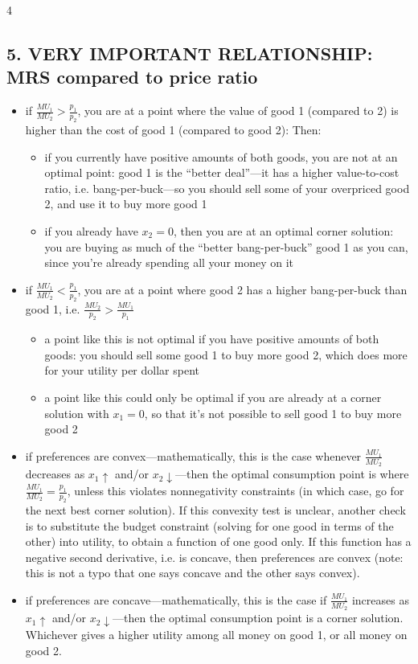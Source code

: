 \documentclass[8pt,landscape]{extarticle}
\begin{document}
\begin{multicols}{4}
\subsection*{5. VERY IMPORTANT RELATIONSHIP: MRS compared to price ratio}
\begin{itemize}[leftmargin=*,noitemsep,topsep=0pt]
\item if $\frac{MU_1}{MU_2} > \frac{p_1}{p_2}$, you are at a point where the value of good 1 (compared to 2) is higher than the cost of good 1 (compared to good 2): Then:
\begin{itemize}[leftmargin=*,noitemsep,topsep=0pt]
\item if you currently have positive amounts of both goods, you are not at an optimal point: good 1 is the ``better deal''---it has a higher value-to-cost ratio, i.e. bang-per-buck---so you should sell some of your overpriced good 2, and use it to buy more good 1
\item if you already have $x_2 = 0$, then you are at an optimal corner solution: you are buying as much of the ``better bang-per-buck'' good 1 as you can, since you're already spending all your money on it
\end{itemize}
\item if $\frac{MU_1}{MU_2} < \frac{p_1}{p_2}$, you are at a point where good 2 has a higher bang-per-buck than good 1, i.e. $\frac{MU_2}{p_2} > \frac{MU_1}{p_1}$
\begin{itemize}[leftmargin=*,noitemsep,topsep=0pt]
\item a point like this is not optimal if you have positive amounts of both goods: you should sell some good 1 to buy more good 2, which does more for your utility per dollar spent
\item a point like this could only be optimal if you are already at a corner solution with $x_1 = 0$, so that it's not possible to sell good 1 to buy more good 2
\end{itemize}
\item if preferences are convex---mathematically, this is the case whenever $\frac{MU_1}{MU_2}$ decreases as $x_1 \uparrow$ and/or $x_2 \downarrow$---then the optimal consumption point is where $\frac{MU_1}{MU_2} = \frac{p_1}{p_2}$, unless this violates nonnegativity constraints (in which case, go for the next best corner solution). If this convexity test is unclear, another check is to substitute the budget constraint (solving for one good in terms of the other) into utility, to obtain a function of one good only. If this function has a negative second derivative, i.e. is concave, then preferences are convex (note: this is not a typo that one says concave and the other says convex).
\item if preferences are concave---mathematically, this is the case if $\frac{MU_1}{MU_2}$ increases as $x_1 \uparrow$ and/or $x_2 \downarrow$---then the optimal consumption point is a corner solution. Whichever gives a higher utility among all money on good 1, or all money on good 2.
\end{itemize}


\end{multicols}
\end{document}
